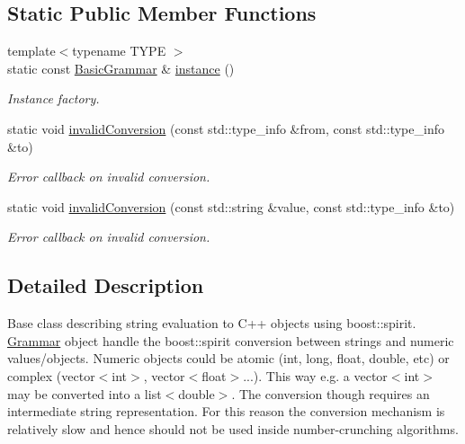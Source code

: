 \subsection*{Static Public Member Functions}
\begin{DoxyCompactItemize}
\item 
{\footnotesize template$<$typename TYPE $>$ }\\static const \hyperlink{class_d_d4hep_1_1_basic_grammar}{BasicGrammar} \& \hyperlink{class_d_d4hep_1_1_basic_grammar_a1b543c027be4ac45b5b6aed3afc487c9}{instance} ()
\begin{DoxyCompactList}\small\item\em Instance factory. \item\end{DoxyCompactList}\item 
static void \hyperlink{class_d_d4hep_1_1_basic_grammar_ac609599119a3a478c5701d0b18d4992a}{invalidConversion} (const std::type\_\-info \&from, const std::type\_\-info \&to)
\begin{DoxyCompactList}\small\item\em Error callback on invalid conversion. \item\end{DoxyCompactList}\item 
static void \hyperlink{class_d_d4hep_1_1_basic_grammar_a5320dae6f06b901657f0839870a46fa1}{invalidConversion} (const std::string \&value, const std::type\_\-info \&to)
\begin{DoxyCompactList}\small\item\em Error callback on invalid conversion. \item\end{DoxyCompactList}\end{DoxyCompactItemize}


\subsection{Detailed Description}
Base class describing string evaluation to C++ objects using boost::spirit. \hyperlink{class_d_d4hep_1_1_grammar}{Grammar} object handle the boost::spirit conversion between strings and numeric values/objects. Numeric objects could be atomic (int, long, float, double, etc) or complex (vector$<$int$>$, vector$<$float$>$...). This way e.g. a vector$<$int$>$ may be converted into a list$<$double$>$. The conversion though requires an intermediate string representation. For this reason the conversion mechanism is relatively slow and hence should not be used inside number-\/crunching algorithms.

